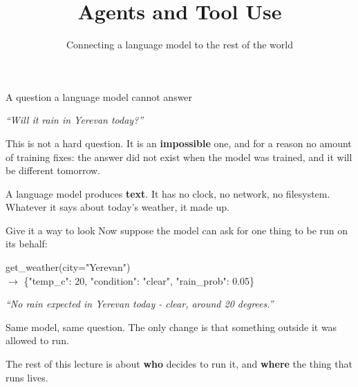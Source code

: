 \documentclass[aspectratio=169]{beamer}
\title{Agents and Tool Use}
\subtitle{Connecting a language model to the rest of the world}
\author{}
\date{}
\newcommand{\keybox}[1]{%
  \begin{tcolorbox}[colback=armblue!8, colframe=armblue, boxrule=0.6pt, arc=2pt]
  #1
  \end{tcolorbox}}
\newcommand{\codebox}[1]{%
  \begin{center}
  \begin{tcolorbox}[colback=lightbg, colframe=gray, boxrule=0.5pt, arc=2pt,
                    width=0.94\textwidth, left=4pt, right=4pt, top=3pt, bottom=3pt]
    \ttfamily\scriptsize #1
  \end{tcolorbox}
  \end{center}}
\begin{document}
\begin{frame}[plain]
  \titlepage
\end{frame}

\begin{frame}{A question a language model cannot answer}
  \vspace{0.8em}
  \begin{center}
  \begin{tcolorbox}[colback=lightbg, colframe=gray, boxrule=0.5pt, arc=2pt, width=0.8\textwidth]
    \centering\textit{``Will it rain in Yerevan today?''}
  \end{tcolorbox}
  \end{center}

  \vspace{0.8em}
  This is not a hard question. It is an \textbf{impossible} one, and for a reason no amount of
  training fixes: the answer did not exist when the model was trained, and it will be different
  tomorrow.

  \vspace{1.0em}
  \keybox{A language model produces \textbf{text}. It has no clock, no network, no filesystem.
  Whatever it says about today's weather, it made up.}
\end{frame}

\begin{frame}{Give it a way to look}
  \vspace{0.6em}
  Now suppose the model can ask for one thing to be run on its behalf:

  \codebox{get\_weather(city="Yerevan")\\[0.4em]
  $\rightarrow$ \{"temp\_c": 20, "condition": "clear", "rain\_prob": 0.05\}}

  \vspace{0.4em}
  \begin{center}
  \begin{tcolorbox}[colback=paramgreen!8, colframe=paramgreen, boxrule=0.6pt, arc=2pt,
                    width=0.8\textwidth]
    \centering\textit{``No rain expected in Yerevan today - clear, around 20 degrees.''}
  \end{tcolorbox}
  \end{center}

  \vspace{0.6em}
  Same model, same question. The only change is that something outside it was allowed to run.

  \vspace{0.5em}
  \begin{center}
  {\small\color{gray}The rest of this lecture is about \textbf{who} decides to run it, and
  \textbf{where} the thing that runs lives.}
  \end{center}
\end{frame}
\end{document}
